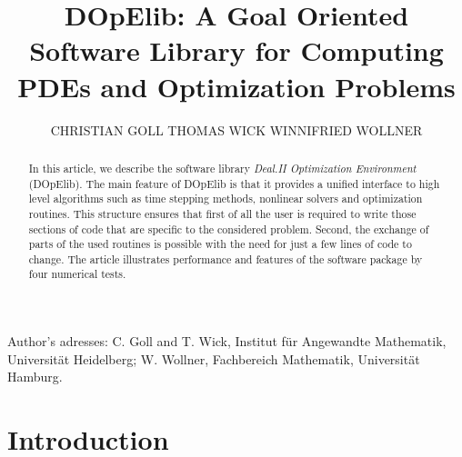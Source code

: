 \documentclass[prodmode,acmtoms]{acmsmall}
\numberwithin{equation}{section}
\begin{document}

\title{DOpElib: A Goal Oriented Software Library for Computing PDEs and Optimization Problems}

\author{CHRISTIAN GOLL
THOMAS WICK
WINNIFRIED WOLLNER
}


\begin{abstract}
In this article, we describe the software library 
\textit{Deal.II Optimization Environment} (DOpElib).
The main feature of DOpElib is that it provides a unified interface to high level algorithms 
such as time stepping methods, nonlinear solvers and optimization routines. This structure ensures 
that first of all the user is required to write those sections of code that are specific to 
the considered problem. Second, the exchange of parts of the used routines is possible 
with the need for just a few lines of code to change.
The article illustrates performance and features 
of the software package by four numerical tests. 
\end{abstract}





\begin{bottomstuff}
Author's adresses: C. Goll {and} T. Wick, Institut f\"ur Angewandte Mathematik, Universit\"at Heidelberg;
W. Wollner, Fachbereich Mathematik, Universit\"at Hamburg.
\end{bottomstuff}
                      

\maketitle


\section{Introduction}
\label{introduction}
\end{document}
